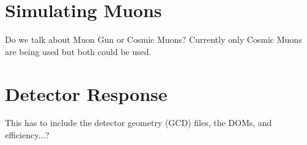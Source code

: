 \section{Simulating Muons}

Do we talk about Muon Gun or Cosmic Muons? Currently only Cosmic Muons are being used but both could be used.

\section{Detector Response}

This has to include the detector geometry (GCD) files, the DOMs, and efficiency...?

